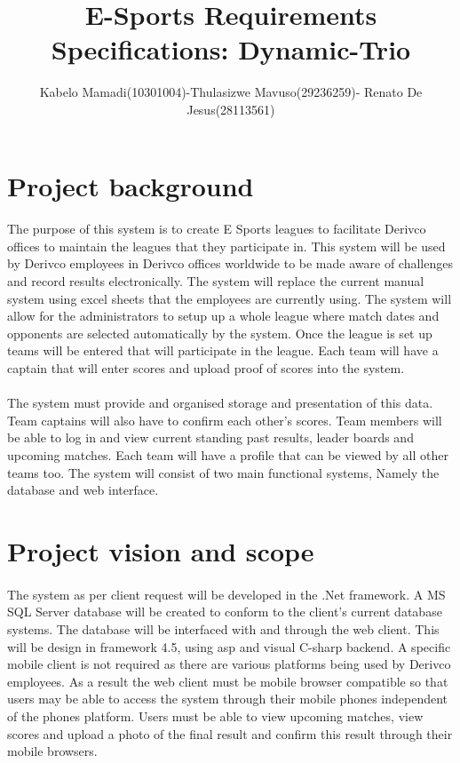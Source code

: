 \documentclass[11pt]{article}
\begin{document}
\begin{titlepage}
\title{E-Sports Requirements Specifications: Dynamic-Trio}
\author{Kabelo Mamadi(10301004)-Thulasizwe Mavuso(29236259)- Renato De Jesus(28113561)}
\maketitle
\end{titlepage}


\section{Project background}
\paragraph{}The
purpose of this system is to create E Sports leagues to facilitate Derivco offices to maintain the leagues that they participate in. This system will be used by Derivco employees in Derivco offices worldwide to be made aware of challenges and record results electronically. The system will replace the current manual system using excel sheets that the employees are currently using. The system will allow for the administrators to setup up a whole league where match dates and opponents are selected automatically by the system. Once the league is set up teams will be entered that will participate in the league. Each team will have a captain that will enter scores and upload proof of scores into the system.

\paragraph{}The system must provide and organised storage and presentation of this data. Team captains will also have to confirm each other’s scores. Team members will be able to log in and view current standing past results, leader boards and upcoming matches. Each team will have a profile that can be viewed by all other teams too. The system will consist of two main functional systems, Namely the database and web interface.

\section{Project vision and scope}
\paragraph{}The system as per client request will be developed in the .Net framework. A MS SQL Server database will be created to conform to the client’s current database systems. The database will be interfaced with and through the web client. This will be design in framework 4.5, using asp and visual C-sharp backend. A specific mobile client is not required as there are various platforms being used by Derivco employees. As a result the web client must be mobile browser compatible so that users may be able to access the system through their mobile phones independent of the phones platform. Users must be able to view upcoming matches, view scores and upload a photo of the final result and confirm this result through their mobile browsers.
\end{document}
